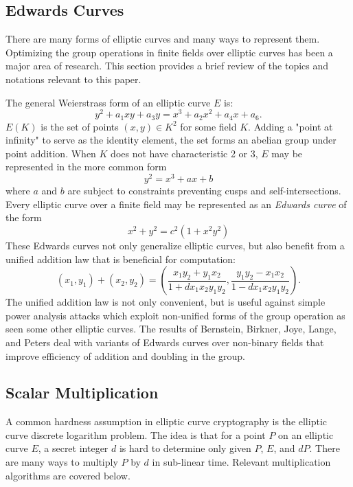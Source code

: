 \documentclass{article}
\begin{document}
\subsection{Edwards Curves}
    There are many forms of elliptic curves and many ways to represent them.
    Optimizing the group operations in finite fields over elliptic curves has
    been a major area of research. This section provides a brief review of the
    topics and notations relevant to this paper.

    The general Weierstrass form of an elliptic curve $E$ is:
    \begin{equation}
        y^2 + a_1xy + a_3y = x^3 + a_2x^2 + a_4x + a_6.
    \end{equation}
    $E(K)$ is the set of points $(x, y) \in K^2$ for some field $K$. Adding a
    "point at infinity" to serve as the identity element, the set forms an
    abelian group under point addition. When $K$ does not have characteristic 2
    or 3, $E$ may be represented in the more common form
    \begin{equation}
        y^2 = x^3 + ax + b
    \end{equation}
    where $a$ and $b$ are subject to constraints preventing cusps and
    self-intersections. Every elliptic curve over a finite field may be
    represented as an \textit{Edwards curve} \cite{tec} of the form 
    \begin{equation}
        x^2 + y^2 = c^2(1 + x^2y^2)
    \end{equation}
    These Edwards curves not only generalize elliptic curves, but also benefit
    from a unified addition law that is beneficial for computation:
    \begin{equation}
        (x_1, y_1) + (x_2, y_2) =
        (\frac{x_1y_2 + y_1x_2}{1 + dx_1x_2y_1y_2},
         \frac{y_1y_2 - x_1x_2}{1 - dx_1x_2y_1y_2}).
    \end{equation}
    The unified addition law is not only convenient, but is useful against
    simple power analysis attacks which exploit non-unified forms of the group
    operation as seen some other elliptic curves. The results of Bernstein,
    Birkner, Joye, Lange, and Peters deal with variants of Edwards curves over
    non-binary fields that improve efficiency of addition and doubling in the
    group.


\subsection{Scalar Multiplication}
    A common hardness assumption in elliptic curve cryptography is the elliptic
    curve discrete logarithm problem. The idea is that for a point $P$ on an
    elliptic curve $E$, a secret integer $d$ is hard to determine only given
    $P$, $E$, and $dP$. There are many ways to multiply $P$ by $d$ in
    sub-linear time. Relevant multiplication algorithms are covered below.
 
\end{document}
